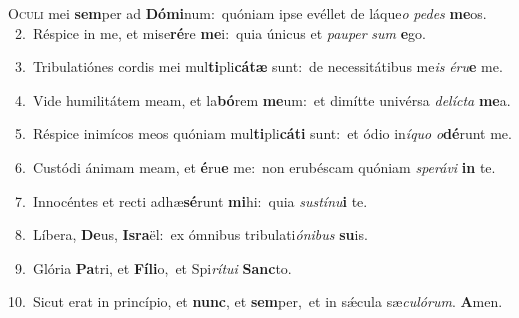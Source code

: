 \lettrine{\initial\textcolor{\initialcolor}{O}}{culi} mei \textbf{sem}\-per ad \textbf{Dó}\-\textbf{mi}num:~\star quóniam ipse evéllet de láque\textit{o} \textit{pe}\-\textit{des} \textbf{me}\-os.\\
{\numbfont\textcolor{\numbcolor}{~2.}}~Réspice in me, et mise\-\textbf{ré}\-re \textbf{me}\-i:~\star quia únicus et \textit{pau}\-\textit{per} \textit{sum} \textbf{e}\-go.\par
{\numbfont\textcolor{\numbcolor}{~3.}}~Tribulatiónes cordis mei mul\-\textbf{ti}\-pli\-\textbf{cá}\-\textbf{tæ} sunt:~\star de necessitátibus me\textit{is} \textit{é}\-\textit{ru}\textbf{e} me.\par
{\numbfont\textcolor{\numbcolor}{~4.}}~Vide humilitátem meam, et la\-\textbf{bó}\-rem \textbf{me}\-um:~\star et dimítte univérsa \textit{de}\-\textit{líc}\textit{ta} \textbf{me}\-a.\par
{\numbfont\textcolor{\numbcolor}{~5.}}~Réspice inimícos meos quóniam mul\-\textbf{ti}\-pli\-\textbf{cá}\-\textbf{ti} sunt:~\star et ódio in\-\textit{í}\-\textit{quo} \textit{o}\-\textbf{dé}runt me.\par
{\numbfont\textcolor{\numbcolor}{~6.}}~Custódi ánimam meam, et \textbf{é}\-ru\textbf{e} me:~\star non erubéscam quóniam \textit{spe}\-\textit{rá}\textit{vi} \textbf{in} te.\par
{\numbfont\textcolor{\numbcolor}{~7.}}~Innocéntes et recti adhæ\-\textbf{sé}\-runt \textbf{mi}\-hi:~\star quia \textit{sus}\-\textit{tí}\textit{nu}\textbf{i} te.\par
{\numbfont\textcolor{\numbcolor}{~8.}}~Líbera, \textbf{De}\-us, \textbf{Is}\-\textbf{ra}ël:~\star ex ómnibus tribulati\-\textit{ó}\-\textit{ni}\textit{bus} \textbf{su}\-is.\par
{\numbfont\textcolor{\numbcolor}{~9.}}~Glória \textbf{Pa}\-tri, et \textbf{Fí}\-\textbf{li}o,~\star et Spi\-\textit{rí}\-\textit{tu}\textit{i} \textbf{Sanc}\-to.\par
{\numbfont\textcolor{\numbcolor}{10.}}~Sicut erat in princípio, et \textbf{nunc}\-, et \textbf{sem}\-per,~\star et in sǽcula sæ\-\textit{cu}\-\textit{ló}\textit{rum}. \textbf{A}\-men.\par
